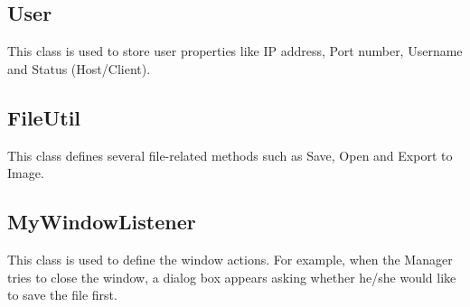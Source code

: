 \subsection{User}
This class is used to store user properties like IP address, Port number, Username and Status (Host/Client).

\subsection{FileUtil}
This class defines several file-related methods such as Save, Open and Export to Image.

\subsection{MyWindowListener}
This class is used to define the window actions. For example, when the Manager tries to close the window, a dialog box appears asking whether he/she would like to save the file first.



